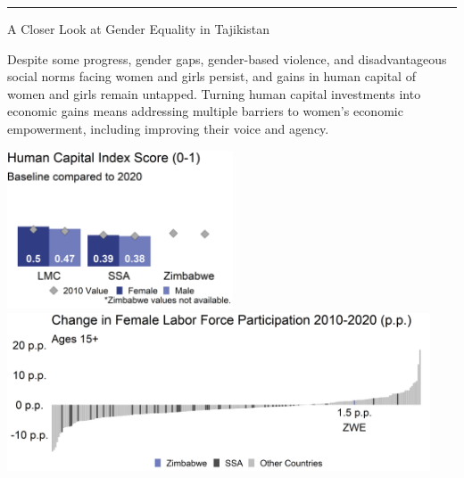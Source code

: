 \documentclass[
]{article}
\begin{document}
\vspace{.3cm}

\centering\rule{19.5cm}{0.5pt}

\vspace{.3cm}

\begin{minipage}[c][1.65cm][t]{19.5cm}
\begin{minipage}[c][1.65cm][t]{6cm}
\begin{spacing}{2}\fontsize{14}{1}\selectfont   
A Closer Look at Gender Equality in Tajikistan
\normalsize
\end{spacing}\end{minipage}\hspace{0.5cm}
\begin{minipage}[c][1.65cm][t]{12.75cm}
\fontsize{9}{8}\selectfont   
Despite some progress, gender gaps, gender-based violence, and disadvantageous social norms facing women and girls persist, and gains in human capital of women and girls remain untapped. Turning human capital investments into economic gains means addressing multiple barriers to women’s economic empowerment, including improving their voice and agency.
\normalsize
\end{minipage}
\end{minipage}

\vspace{.15cm}

\begin{minipage}[t][4.7cm][t]{19.5cm}
\href{https://genderdata.worldbank.org/indicators/hd-hci-ovrl}{\includegraphics[height=4.7cm]{HCIplot.png}}\hspace{.2cm}
\href{https://genderdata.worldbank.org/indicators/sl-tlf-acti-zs/}{\includegraphics[height=4.7cm]{LFPplot.png}}  
\end{minipage}
\end{document}
